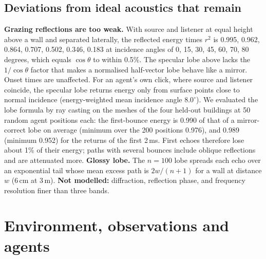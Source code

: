\documentclass[10pt]{article}
\begin{document}
\subsection{Deviations from ideal acoustics that remain}
\label{sec:deviations}
\textbf{Grazing reflections are too weak.} With source and listener at equal height above a wall and separated laterally, the reflected energy times $r^2$ is 0.995, 0.962, 0.864, 0.707, 0.502, 0.346, 0.183 at incidence angles of 0, 15, 30, 45, 60, 70, 80 degrees, which equals $\cos\theta$ to within 0.5\%. The specular lobe above lacks the $1/\cos\theta$ factor that makes a normalised half-vector lobe behave like a mirror. Onset times are unaffected. For an agent's own click, where source and listener coincide, the specular lobe returns energy only from surface points close to normal incidence (energy-weighted mean incidence angle $8.0^\circ$). We evaluated the lobe formula by ray casting on the meshes of the four held-out buildings at 50 random agent positions each: the first-bounce energy is 0.990 of that of a mirror-correct lobe on average (minimum over the 200 positions 0.976), and 0.989 (minimum 0.952) for the returns of the first 2\,ms. First echoes therefore lose about 1\% of their energy; paths with several bounces include oblique reflections and are attenuated more.
\textbf{Glossy lobe.} The $n=100$ lobe spreads each echo over an exponential tail whose mean excess path is $2w/(n+1)$ for a wall at distance $w$ (6\,cm at 3\,m).
\textbf{Not modelled:} diffraction, reflection phase, and frequency resolution finer than three bands.

\section{Environment, observations and agents}
\label{sec:env}
\end{document}
